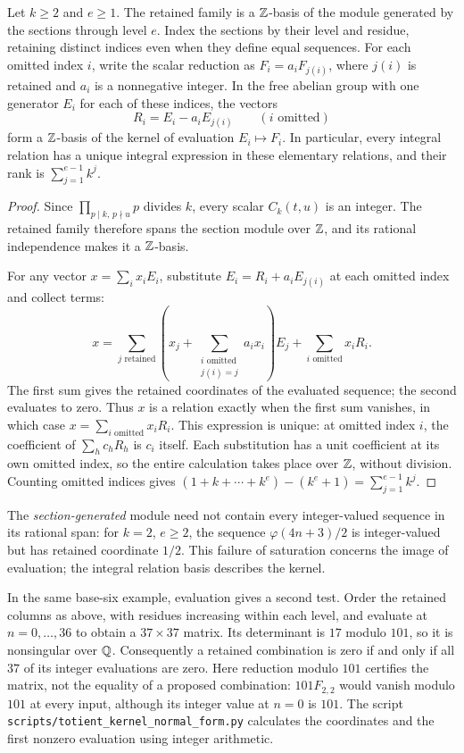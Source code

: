\documentclass[11pt]{article}
\begin{document}
\begin{corollary}\label{cor:integral-normal-form}
Let $k\ge2$ and $e\ge1$. The retained family is a $\mathbb{Z}$-basis of the
module generated by the sections through level $e$. Index the sections
by their level and residue, retaining distinct indices even when they
define equal sequences. For each omitted index $i$, write the scalar
reduction as $F_i=a_iF_{j(i)}$, where $j(i)$ is retained and $a_i$ is a
nonnegative integer. In the free abelian group with one generator $E_i$
for each of these indices, the vectors
\[
 R_i=E_i-a_iE_{j(i)}\qquad(i\text{ omitted})
\]
form a $\mathbb{Z}$-basis of the kernel of evaluation $E_i\mapsto F_i$.
In particular, every integral relation has a unique integral expression
in these elementary relations, and their rank is
$\sum_{j=1}^{e-1}k^j$.
\end{corollary}
\begin{proof}
Since $\prod_{p\mid k,\,p\nmid u}p$ divides $k$, every scalar
$C_k(t,u)$ is an integer. The retained family therefore spans the
section module over $\mathbb{Z}$, and its rational independence makes it a
$\mathbb{Z}$-basis.

For any vector $x=\sum_i x_iE_i$, substitute
$E_i=R_i+a_iE_{j(i)}$ at each omitted index and collect terms:
\[
 x=\sum_{j\text{ retained}}
       \left(x_j+\sum_{\substack{i\text{ omitted}\\j(i)=j}}a_i x_i\right)E_j
       +\sum_{i\text{ omitted}}x_iR_i.
\]
The first sum gives the retained coordinates of the evaluated
sequence; the second evaluates to zero. Thus $x$ is a relation
exactly when the first sum vanishes, in which case
$x=\sum_{i\text{ omitted}}x_iR_i$. This expression is unique:
at omitted index $i$, the coefficient of $\sum_h c_hR_h$ is $c_i$
itself. Each substitution has a unit coefficient at its own omitted
index, so the entire calculation takes place over $\mathbb{Z}$, without division.
Counting omitted indices gives
$(1+k+\cdots+k^e)-(k^e+1)=\sum_{j=1}^{e-1}k^j$.
\end{proof}
The \emph{section-generated} module need not contain every integer-valued
sequence in its rational span: for $k=2$, $e\ge2$, the sequence
$\varphi(4n+3)/2$ is integer-valued but has retained coordinate $1/2$.
This failure of saturation concerns the image of evaluation; the integral
relation basis describes the kernel.

In the same base-six example, evaluation gives a second test.
Order the retained columns as above, with residues increasing within
each level, and evaluate at $n=0,\ldots,36$ to obtain a $37\times37$ matrix.
Its determinant is $17$ modulo $101$, so it is nonsingular over $\mathbb{Q}$.
Consequently a retained combination is zero if and only if all $37$
of its integer evaluations are zero. Here reduction modulo $101$
certifies the matrix, not the equality of a proposed combination:
$101F_{2,2}$ would vanish modulo $101$ at every input, although its
integer value at $n=0$ is $101$.
The script \texttt{scripts/totient\_kernel\_normal\_form.py} calculates
the coordinates and the first nonzero evaluation using integer arithmetic.
\end{document}

